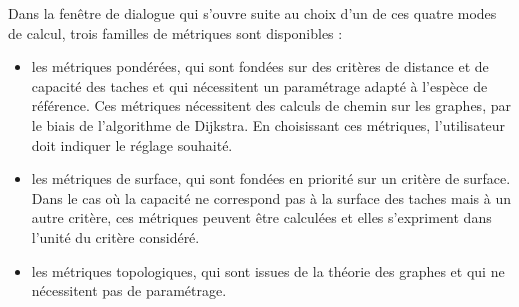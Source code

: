 \documentclass{article}
\begin{document}
Dans la fenêtre de dialogue qui s’ouvre suite au choix d’un de ces quatre modes de calcul, trois familles de métriques sont disponibles :
\begin{itemize}
	\item les métriques pondérées, qui sont fondées sur des critères de distance et de capacité des taches et qui nécessitent un paramétrage adapté à l’espèce de référence. Ces métriques nécessitent des calculs de chemin sur les graphes, par le biais de l’algorithme de Dijkstra. En choisissant ces métriques, l’utilisateur doit indiquer le réglage souhaité.
	\item les métriques de surface, qui sont fondées en priorité sur un critère de surface. Dans le cas où la capacité ne correspond pas à la surface des taches mais à un autre critère, ces métriques peuvent être calculées et elles s’expriment dans l’unité du critère considéré. 
	\item les métriques topologiques, qui sont issues de la théorie des graphes et qui ne nécessitent pas de paramétrage.
\end{itemize}
\end{document}
